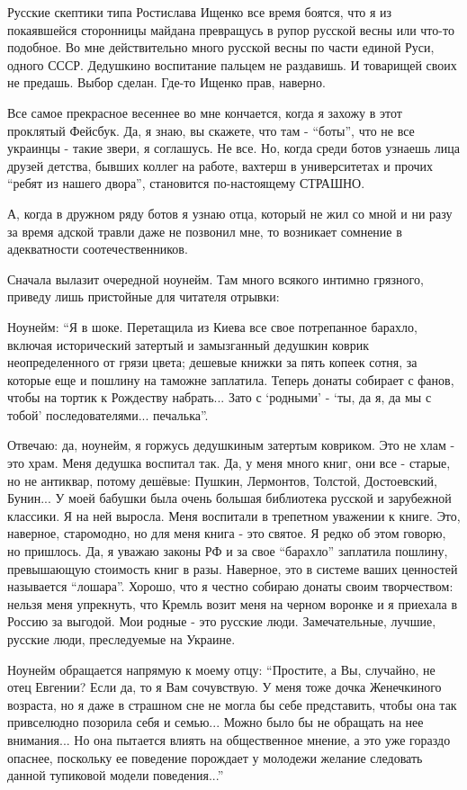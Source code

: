 Русские скептики типа Ростислава Ищенко все время боятся, что я из покаявшейся
сторонницы майдана превращусь в рупор русской весны или что-то подобное. Во мне
действительно много русской весны по части единой Руси, одного СССР. Дедушкино
воспитание пальцем не раздавишь. И товарищей своих не предашь. Выбор сделан.
Где-то Ищенко прав, наверно.

Все самое прекрасное весеннее во мне кончается, когда я захожу в этот проклятый
Фейсбук. Да, я знаю, вы скажете, что там - \enquote{боты}, что не все украинцы - такие
звери, я соглашусь. Не все. Но, когда среди ботов узнаешь лица друзей детства,
бывших коллег на работе, вахтерш в университетах и прочих \enquote{ребят из нашего
двора},  становится по-настоящему СТРАШНО. 

А, когда в дружном ряду ботов я узнаю отца, который не жил со мной и ни разу за
время адской травли даже не позвонил мне, то возникает сомнение в адекватности
соотечественников. 

Сначала вылазит очередной ноунейм. Там много всякого интимно грязного, приведу
лишь пристойные для читателя отрывки:

Ноунейм: \enquote{Я в шоке. Перетащила из Киева все свое потрепанное барахло, включая
исторический затертый и замызганный дедушкин коврик неопределенного от грязи
цвета; дешевые книжки за пять копеек сотня, за которые еще и пошлину на таможне
заплатила. Теперь донаты собирает с фанов, чтобы на тортик к Рождеству
набрать... Зато с \enquote{родными} - \enquote{ты, да я, да мы с тобой} последователями...
печалька}.

Отвечаю: да, ноунейм, я горжусь дедушкиным затертым ковриком. Это не хлам - это
храм. Меня дедушка воспитал так. Да, у меня много книг, они все - старые, но не
антиквар, потому дешёвые: Пушкин, Лермонтов, Толстой, Достоевский, Бунин... У
моей бабушки была очень большая библиотека русской и зарубежной классики. Я на
ней выросла. Меня воспитали в трепетном уважении к книге. Это, наверное,
старомодно, но для меня книга - это святое. Я редко об этом говорю, но
пришлось. Да, я уважаю законы РФ и за свое \enquote{барахло} заплатила пошлину,
превышающую стоимость книг в разы. Наверное, это в системе ваших ценностей
называется \enquote{лошара}. Хорошо, что я честно собираю донаты своим творчеством:
нельзя меня упрекнуть, что Кремль возит меня на черном воронке и я приехала в
Россию за выгодой. Мои родные - это русские люди. Замечательные, лучшие,
русские люди, преследуемые на Украине.

Ноунейм обращается напрямую к моему отцу: \enquote{Простите, а Вы, случайно, не отец
Евгении? Если да, то я Вам сочувствую. У меня тоже дочка Женечкиного возраста,
но я даже в страшном сне не могла бы себе представить, чтобы она так
привселюдно позорила себя и семью... Можно было бы не обращать на нее
внимания... Но она пытается влиять на общественное мнение, а это уже гораздо
опаснее, поскольку ее поведение порождает у молодежи желание следовать данной
тупиковой модели поведения...}

